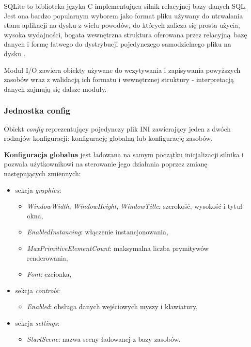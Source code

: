 SQLite \cite{SQLITE} to biblioteka języka C implementująca silnik relacyjnej bazy danych SQL.
Jest ona bardzo popularnym wyborem jako format pliku używany do utrwalania stanu aplikacji na dysku z wielu powodów, do których zalicza się prosta użycia, wysoka wydajności, bogata wewnętrzna struktura oferowana przez relacyjną bazę danych i formę łatwego do dystrybucji pojedynczego samodzielnego pliku na dysku \cite{SQLITEAPPFORMAT}.

Moduł I/O zawiera obiekty używane do wczytywania i zapisywania powyższych zasobów wraz z walidacją ich formatu i wewnętrznej struktury - interpretacją danych zajmują się dalsze moduły.

\subsubsection{Jednostka config}
Obiekt \textit{config} reprezentujący pojedynczy plik INI zawierający jeden z dwóch rodzajów konfiguracji: konfigurację globalną lub konfigurację zasobów.

\textbf{Konfiguracja globalna} jest ładowana na samym początku inicjalizacji silnika i pozwala użytkownikowi na sterowanie jego działania poprzez zmianę następujących zmiennych:
\begin{itemize}
	\item sekcja \textit{graphics}:
	\begin{itemize}
		\item \textit{WindowWidth}, \textit{WindowHeight}, \textit{WindowTitle}: szerokość, wysokość i tytuł okna,
		\item \textit{EnabledInstancing}: włączenie instancjonowania,
		\item \textit{MaxPrimitiveElementCount}: maksymalna liczba prymitywów renderowania,
		\item \textit{Font}: czcionka,
	\end{itemize}
	\item sekcja \textit{controls}:
	\begin{itemize}
		\item \textit{Enabled}: obsługa danych wejściowych myszy i klawiatury,
	\end{itemize}
	\item sekcja \textit{settings}:
	\begin{itemize}
		\item \textit{StartScene}: nazwa sceny ładowanej z bazy zasobów.
	\end{itemize}
\end{itemize}

